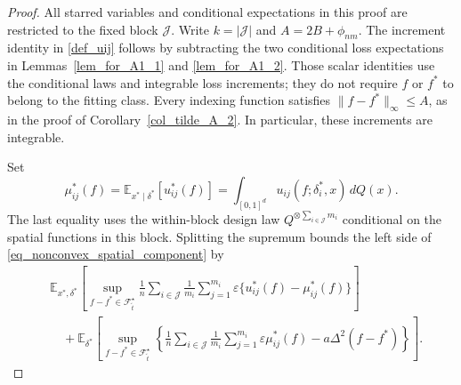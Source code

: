\documentclass[twoside,11pt]{article}
\newenvironment{revision}{\color{revisionred}}{}
\begin{document}
\begin{revision}
\begin{proof}
All starred variables and conditional expectations in this proof are
restricted to the fixed block $\mathcal J$.
Write $k=|\mathcal J|$ and $A=2B+\phi_{nm}$.
The increment identity in \eqref{def_uij} follows by subtracting
the two conditional loss expectations in
Lemmas~\ref{lem_for_A1_1} and \ref{lem_for_A1_2}.
Those scalar identities use the conditional laws and integrable
loss increments; they do not require $f$ or $f^*$ to belong to
the fitting class.
Every indexing function satisfies $\|f-f^*\|_\infty\leq A$, as in
the proof of Corollary~\ref{col_tilde_A_2}.
In particular, these increments are integrable.

Set
\[
\mu_{ij}^*(f)
=\mathbb E_{x^*\mid\delta^*}[u_{ij}^*(f)]
=\int_{[0,1]^d}u_{ij}(f;\delta_i^*,x)\,dQ(x).
\]
The last equality uses the within-block design law
$Q^{\otimes\sum_{i\in\mathcal J}m_i}$ conditional on the spatial
functions in this block. Splitting the supremum bounds the left
side of \eqref{eq_nonconvex_spatial_component} by
\begin{align*}
&\mathbb E_{x^*,\delta^*}\left[
\sup_{f-f^*\in\mathcal F_{\tilde t}^{\star}}
\frac1n\sum_{i\in\mathcal J}\frac1{m_i}\sum_{j=1}^{m_i}
\varepsilon\{u_{ij}^*(f)-\mu_{ij}^*(f)\}\right]\\
&\quad+
\mathbb E_{\delta^*}\left[
\sup_{f-f^*\in\mathcal F_{\tilde t}^{\star}}
\left\{\frac1n\sum_{i\in\mathcal J}\frac1{m_i}\sum_{j=1}^{m_i}
\varepsilon\mu_{ij}^*(f)-a\Delta^2(f-f^*)\right\}\right].
\end{align*}


\end{proof}
\end{revision}
\end{document}
